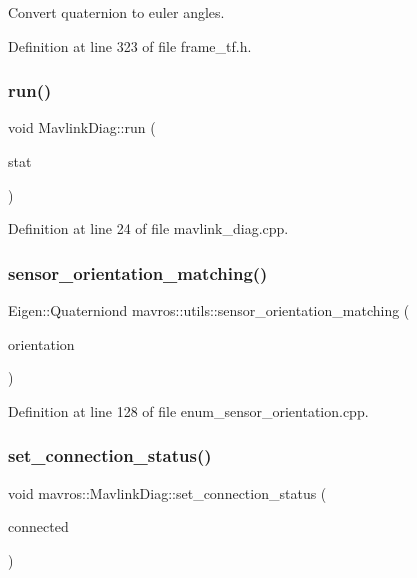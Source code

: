 Convert quaternion to euler angles. 



Definition at line 323 of file frame\+\_\+tf.\+h.

\mbox{\label{group__nodelib_gae5789a005615261233f253b00366693a}} 
\subsubsection{\texorpdfstring{run()}{run()}}
{\footnotesize\ttfamily void Mavlink\+Diag\+::run (\begin{DoxyParamCaption}\item[{diagnostic\+\_\+updater\+::\+Diagnostic\+Status\+Wrapper \&}]{stat }\end{DoxyParamCaption})}



Definition at line 24 of file mavlink\+\_\+diag.\+cpp.

\mbox{\label{group__nodelib_ga4a6acaf5ab9bea03955ceb53971e2aab}} 
\subsubsection{\texorpdfstring{sensor\_orientation\_matching()}{sensor\_orientation\_matching()}}
{\footnotesize\ttfamily Eigen\+::\+Quaterniond mavros\+::utils\+::sensor\+\_\+orientation\+\_\+matching (\begin{DoxyParamCaption}\item[{M\+A\+V\+\_\+\+S\+E\+N\+S\+O\+R\+\_\+\+O\+R\+I\+E\+N\+T\+A\+T\+I\+ON}]{orientation }\end{DoxyParamCaption})}



Definition at line 128 of file enum\+\_\+sensor\+\_\+orientation.\+cpp.

\mbox{\label{group__nodelib_ga53b91990e409eb66ad3dfcc6cefa0435}} 
\subsubsection{\texorpdfstring{set\_connection\_status()}{set\_connection\_status()}}
{\footnotesize\ttfamily void mavros\+::\+Mavlink\+Diag\+::set\+\_\+connection\+\_\+status (\begin{DoxyParamCaption}\item[{bool}]{connected }\end{DoxyParamCaption})\hspace{0.3cm}{\ttfamily [inline]}}



